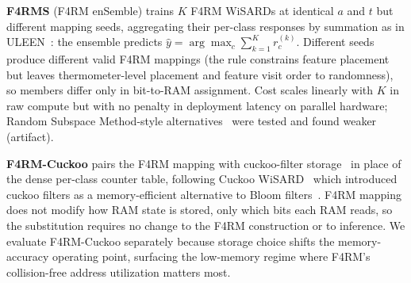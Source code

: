 \textbf{F4RMS} (F4RM enSemble) trains $K$ F4RM WiSARDs at identical $a$ and $t$ but different mapping seeds, aggregating their per-class responses by summation as in ULEEN~\cite{susskind2023uleen}: the ensemble predicts $\hat{y} = \arg\max_c \sum_{k=1}^{K} r^{(k)}_c$. Different seeds produce different valid F4RM mappings (the rule constrains feature placement but leaves thermometer-level placement and feature visit order to randomness), so members differ only in bit-to-RAM assignment. Cost scales linearly with $K$ in raw compute but with no penalty in deployment latency on parallel hardware; Random Subspace Method-style alternatives~\cite{ho1998random,breiman2001random} were tested and found weaker (artifact).

\textbf{F4RM-Cuckoo} pairs the F4RM mapping with cuckoo-filter storage~\cite{fan2014cuckoo} in place of the dense per-class counter table, following Cuckoo WiSARD~\cite{santiago2019thesis} which introduced cuckoo filters as a memory-efficient alternative to Bloom filters~\cite{santiago2020bloom}. F4RM mapping does not modify how RAM state is stored, only which bits each RAM reads, so the substitution requires no change to the F4RM construction or to inference. We evaluate F4RM-Cuckoo separately because storage choice shifts the memory-accuracy operating point, surfacing the low-memory regime where F4RM's collision-free address utilization matters most.
